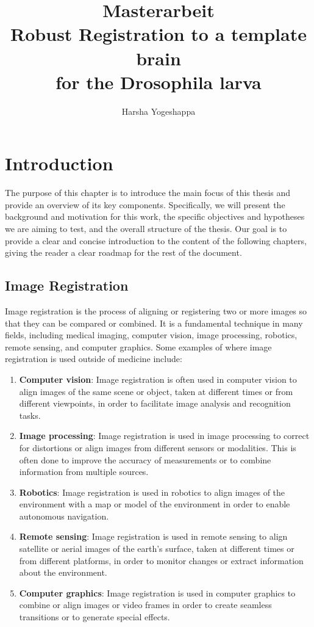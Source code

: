 \documentclass{report}
\title{
	Masterarbeit \\
	Robust Registration to a template brain  \\
	for the Drosophila larva \large }
\author{Harsha Yogeshappa}
\begin{document}
	\maketitle
	\newpage
	
	\hypersetup{linkcolor=rwth-blue-1}
	\tableofcontents	

	\newpage
	
	\chapter{Introduction}
	The purpose of this chapter is to introduce the main focus of this thesis and provide an overview of its key components. Specifically, we will present the background and motivation for this work, the specific objectives and hypotheses we are aiming to test, and the overall structure of the thesis. Our goal is to provide a clear and concise introduction to the content of the following chapters, giving the reader a clear roadmap for the rest of the document.
	
	\section{Image Registration}
	Image registration is the process of aligning or registering two or more images so that they can be compared or combined. It is a fundamental technique in many fields, including medical imaging, computer vision, image processing, robotics, remote sensing, and computer graphics. Some examples of where image registration is used outside of medicine include:
	\begin{enumerate}
		\item \textbf{Computer vision}: Image registration is often used in computer vision to align images of the same scene or object, taken at different times or from different viewpoints, in order to facilitate image analysis and recognition tasks.
		\item \textbf{Image processing}: Image registration is used in image processing to correct for distortions or align images from different sensors or modalities. This is often done to improve the accuracy of measurements or to combine information from multiple sources.
		\item \textbf{Robotics}: Image registration is used in robotics to align images of the environment with a map or model of the environment in order to enable autonomous navigation.
		\item \textbf{Remote sensing}: Image registration is used in remote sensing to align satellite or aerial images of the earth's surface, taken at different times or from different platforms, in order to monitor changes or extract information about the environment.
		\item \textbf{Computer graphics}: Image registration is used in computer graphics to combine or align images or video frames in order to create seamless transitions or to generate special effects.
	\end{enumerate}
	
\end{document}
